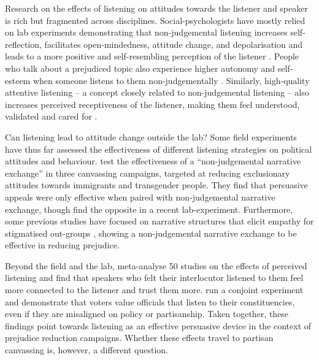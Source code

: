 \documentclass[11pt,a4paper]{scrartcl}
\begin{document}
Research on the effects of listening on attitudes towards the listener and speaker is rich but fragmented across disciplines. Social-psychologists have mostly relied on lab experiments demonstrating that non-judgemental listening increases self-reflection, facilitates open-mindedness, attitude change,  and depolarisation and leads to a more positive and self-resembling perception of the listener \autocite{itzchakovListeningUnderstandRole2024}. People who talk about a prejudiced topic also experience higher autonomy and self-esteem when someone listens to them non-judgementally \autocite{itzchakovHighQualityListeningSupports2021}. Similarly, high-quality attentive listening -- a concept closely related to non-judgemental listening \autocites[see][249-250]{itzchakovHighQualityListeningSupports2021}[][1]{itzchakovCanHighQuality2020} -- also increases perceived receptiveness of the listener, making them feel understood, validated and cared for  \autocites{itzchakovHowFosterPerceived2022}{itzchakovCanHighQuality2020}.

Can listening lead to attitude change outside the lab? Some field experiments have thus far assessed the effectiveness of different listening strategies on political attitudes and behaviour. \textcite{kallaReducingExclusionaryAttitudes2020} test the effectiveness of a \enquote{non-judgemental narrative exchange} in three canvassing campaigns, targeted at reducing exclusionary attitudes towards immigrants and transgender people. They find that persuasive appeals were only effective when paired with non-judgemental narrative exchange, though \textcite{santoroListenChangeLongitudinal2024} find the opposite in a recent lab-experiment.  Furthermore, some previous studies have focused on narrative structures that elicit empathy for stigmatised out-groups \autocites{kallaWhichNarrativeStrategies2023}{broockmanDurablyReducingTransphobia2016}, showing a non-judgemental narrative exchange to be effective in reducing prejudice.

Beyond the field and the lab, \textcite{vogelEvidentiaryBasisPolitical2025} meta-analyse 50 studies on the effects of perceived listening and find that speakers who felt their interlocutor listened to them feel more connected to the listener and trust them more. \textcite{busbyTheyEvenCare2025} run a conjoint experiment and demonstrate that voters value officials that listen to their constituencies, even if they are misaligned on policy or partisanship. Taken together, these findings point towards listening as an effective persuasive device in the context of prejudice reduction campaigns. Whether these effects travel to partisan canvassing is, however, a different question.
\end{document}
